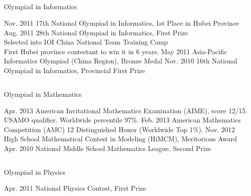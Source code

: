 \documentclass[]{friggeri-cv} %
\begin{document}
\subsection{}{Olympiad in Informatics}
\begin{entrylist}
\centry
{Nov. 2011}
{17th National Olympiad in Informatics, 1st Place in Hubei Province}
\centry
{Aug. 2011}
{28th National Olympiad in Informatics, First Prize \\
Selected into IOI China National Team Training Camp \\
First Hubei province contestant to win it in 6 years. }
\centry
{May 2011}
{Asia-Pacific Informatics Olympiad (China Region), Bronze Medal}
\centry
{Nov. 2010}
{16th National Olympiad in Informatics, Provincial First Prize}
\end{entrylist}
\subsection{}{Olympiad in Mathematics}
\begin{entrylist}
\centry
{Apr. 2013}
{American Invitational Mathematics Examination (AIME), score 12/15. USAMO qualifier. Worldwide percentile 97\%. }
\centry
{Feb. 2013}
{American Mathematics Competition (AMC) 12 Distinguished Honor (Worldwide Top 1\%). }
\centry
{Nov. 2012}
{High School Mathematical Contest in Modeling (HiMCM), Meritorious Award}
\centry
{Apr. 2010}
{National Middle School Mathematics League, Second Prize}
\end{entrylist}
\subsection{}{Olympiad in Physics}
\begin{entrylist}
\centry
{Apr. 2011}
{National Physics Contest, First Prize}
\end{entrylist}


\end{document}

